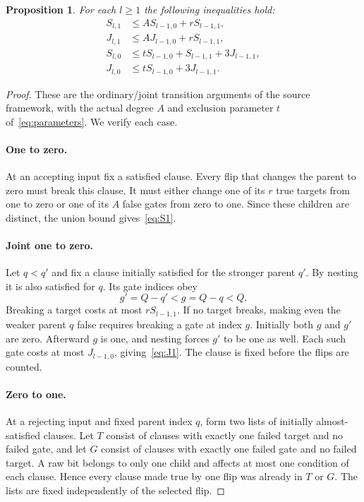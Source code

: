 \documentclass[11pt]{article}
\newtheorem{proposition}[theorem]{Proposition}
\theoremstyle{definition}
\begin{document}
\begin{proposition}\label{prop:recurrences}
For each $l\ge1$ the following inequalities hold:
\begin{align}
 S_{l,1}&\le A S_{l-1,0}+rS_{l-1,1},\label{eq:S1}\\
 J_{l,1}&\le A J_{l-1,0}+rS_{l-1,1},\label{eq:J1}\\
 S_{l,0}&\le t S_{l-1,0}+S_{l-1,1}+3J_{l-1,1},\label{eq:S0}\\
 J_{l,0}&\le t S_{l-1,0}+3J_{l-1,1}.\label{eq:J0}
\end{align}
\end{proposition}
\begin{proof}
These are the ordinary/joint transition arguments of the source framework, with the actual degree $A$ and exclusion parameter $t$ of~\eqref{eq:parameters}. We verify each case.

\paragraph{One to zero.}
At an accepting input fix a satisfied clause. Every flip that changes the parent to zero must break this clause. It must either change one of its $r$ true targets from one to zero or one of its $A$ false gates from zero to one. Since these children are distinct, the union bound gives~\eqref{eq:S1}.

\paragraph{Joint one to zero.}
Let $q<q'$ and fix a clause initially satisfied for the stronger parent $q'$. By nesting it is also satisfied for $q$. Its gate indices obey
\[
 g'=Q-q'<g=Q-q<Q.
\]
Breaking a target costs at most $rS_{l-1,1}$. If no target breaks, making even the weaker parent $q$ false requires breaking a gate at index $g$. Initially both $g$ and $g'$ are zero. Afterward $g$ is one, and nesting forces $g'$ to be one as well. Each such gate costs at most $J_{l-1,0}$, giving~\eqref{eq:J1}. The clause is fixed before the flips are counted.

\paragraph{Zero to one.}
At a rejecting input and fixed parent index $q$, form two lists of initially almost-satisfied clauses. Let $T$ consist of clauses with exactly one failed target and no failed gate, and let $G$ consist of clauses with exactly one failed gate and no failed target. A raw bit belongs to only one child and affects at most one condition of each clause. Hence every clause made true by one flip was already in $T$ or $G$. The lists are fixed independently of the selected flip.


\end{proof}
\end{document}
